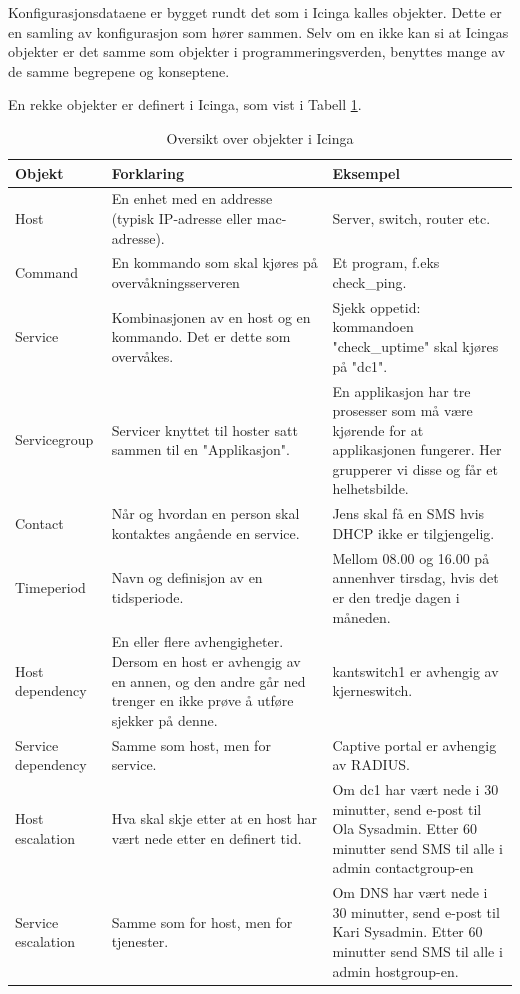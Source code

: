 Konfigurasjonsdataene er bygget rundt det som i Icinga kalles objekter. Dette er en samling av konfigurasjon som hører sammen. Selv om en ikke kan si at Icingas objekter er det samme som objekter i programmeringsverden, benyttes mange av de samme begrepene og konseptene.

En rekke objekter er definert i Icinga, som vist i Tabell \ref{objekter}.

\begin{changemargin}{-1cm}{-1cm}
\begin{table}
\begin{center}
\begin{tabular}{ | p{3.5cm} | p{6.5cm} | p{6cm} |} \hline
	\textbf{Objekt} & \textbf{Forklaring} & \textbf{Eksempel} \\ \hline
	Host & En enhet med en addresse (typisk IP-adresse eller mac-adresse). & Server, switch, router etc. \\ \hline
	Command & En kommando som skal kjøres på overvåkningsserveren & Et program, f.eks check\_ping. \\ \hline 
	Service & Kombinasjonen av en host og en kommando. Det er dette som overvåkes. & Sjekk oppetid: kommandoen "check\_uptime" skal kjøres på "dc1". \\ \hline
	Servicegroup & Servicer knyttet til hoster satt sammen til en "Applikasjon". & En applikasjon har tre prosesser som må være kjørende for at applikasjonen fungerer. Her grupperer vi disse og får et helhetsbilde. \\ \hline
	Contact & Når og hvordan en person skal kontaktes angående en service. & Jens skal få en SMS hvis DHCP ikke er tilgjengelig. \\ \hline
	Timeperiod & Navn og definisjon av en tidsperiode. & Mellom 08.00 og 16.00 på annenhver tirsdag, hvis det er den tredje dagen i måneden. \\ \hline
	Host dependency & En eller flere avhengigheter. Dersom en host er avhengig av en annen, og den andre går ned trenger en ikke prøve å utføre sjekker på denne. & kantswitch1 er avhengig av kjerneswitch. \\ \hline
	Service dependency & Samme som host, men for service. & Captive portal er avhengig av RADIUS. \\ \hline
	Host escalation & Hva skal skje etter at en host har vært nede etter en definert tid. &	Om dc1 har vært nede i 30 minutter, send e-post til Ola Sysadmin. Etter 60 minutter send SMS til alle i admin contactgroup-en \\ \hline
	Service escalation & Samme som for host, men for tjenester. & Om DNS har vært nede i 30 minutter, send e-post til Kari Sysadmin. Etter 60 minutter send SMS til alle i admin hostgroup-en. \\ \hline
	\end{tabular}
	\caption{Oversikt over objekter i Icinga}
	\label{objekter}
\end{center}
\end{table}
\end{changemargin}

